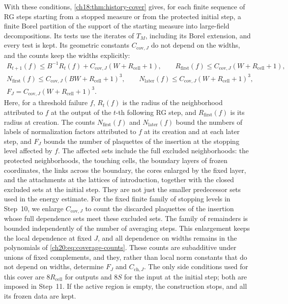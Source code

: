 With these conditions, \cref{ch18:thm:history-cover} gives, for each finite sequence of RG steps starting from a stopped measure or from the protected initial step, a finite Borel partition of the support of the starting measure into large-field decompositions. Its tests use the iterates of $T_M$, including its Borel extension, and every test is kept. Its geometric constants $C_{\mathrm{cov},J}$ do not depend on the widths, and the counts keep the widths explicitly:
\begin{equation}\label{ch20:eq:coverage-counts}
 \begin{gathered}
 R_{t+1}(f)\le B^{-1}R_t(f)+C_{\mathrm{cov},J}(W+R_{\mathrm{cell}}+1),\qquad
 R_{\mathrm{first}}(f)\le C_{\mathrm{cov},J}(W+R_{\mathrm{cell}}+1),\\
 N_{\mathrm{first}}(f)\le C_{\mathrm{cov},J}(BW+R_{\mathrm{cell}}+1)^3,\qquad
 N_{\mathrm{later}}(f)\le C_{\mathrm{cov},J}(W+R_{\mathrm{cell}}+1)^3,\\
 F_J=C_{\mathrm{cov},J}(W+R_{\mathrm{cell}}+1)^3.
 \end{gathered}
\end{equation}
Here, for a threshold failure $f$, $R_t(f)$ is the radius of the neighborhood attributed to $f$ at the output of the $t$-th following RG step, and $R_{\mathrm{first}}(f)$ is its radius at creation. The counts $N_{\mathrm{first}}(f)$ and $N_{\mathrm{later}}(f)$ bound the numbers of labels of normalization factors attributed to $f$ at its creation and at each later step, and $F_J$ bounds the number of plaquettes of the insertion at the stopping level affected by $f$. The affected sets include the full excluded neighborhoods: the protected neighborhoods, the touching cells, the boundary layers of frozen coordinates, the links across the boundary, the cores enlarged by the fixed layer, and the attachments at the lattices of introduction, together with the closed excluded sets at the initial step. They are not just the smaller predecessor sets used in the energy estimate. For the fixed finite family of stopping levels in Step~10, we enlarge $C_{\mathrm{cov},J}$ to count the discarded plaquettes of the insertion whose full dependence sets meet these excluded sets. The family of remainders is bounded independently of the number of averaging steps. This enlargement keeps the local dependence at fixed $J$, and all dependence on widths remains in the polynomials of \eqref{ch20:eq:coverage-counts}. These counts are subadditive under unions of fixed complements, and they, rather than local norm constants that do not depend on widths, determine $F_J$ and $C_{\mathrm{ch},J}$. The only side conditions used for this cover are $8R_{\mathrm{cell}}$ for outputs and $8S$ for the input at the initial step; both are imposed in Step~11. If the active region is empty, the construction stops, and all its frozen data are kept.

